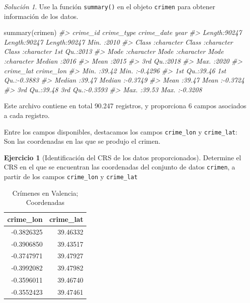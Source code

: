 \documentclass[
]{book}
\newenvironment{Shaded}{\begin{snugshade}}{\end{snugshade}}
\newcommand{\CommentTok}[1]{\textcolor[rgb]{0.56,0.35,0.01}{\textit{#1}}}
\newcommand{\FunctionTok}[1]{\textcolor[rgb]{0.00,0.00,0.00}{#1}}
\newcommand{\NormalTok}[1]{#1}
\theoremstyle{definition}
\theoremstyle{definition}
\theoremstyle{definition}
\newtheorem{exercise}{Ejercicio}[chapter]
\theoremstyle{definition}
\theoremstyle{remark}
\newtheorem*{solution}{Solución}
\begin{document}
\begin{solution}
Use la función \texttt{summary()} en el objeto \texttt{crimen} para obtener información de los
datos.
\end{solution}

\begin{Shaded}
\begin{Highlighting}[]
\FunctionTok{summary}\NormalTok{(crimen)}
\CommentTok{\#\textgreater{}    crime\_id          crime\_type         crime\_date             year     }
\CommentTok{\#\textgreater{}  Length:90247       Length:90247       Length:90247       Min.   :2010  }
\CommentTok{\#\textgreater{}  Class :character   Class :character   Class :character   1st Qu.:2013  }
\CommentTok{\#\textgreater{}  Mode  :character   Mode  :character   Mode  :character   Median :2016  }
\CommentTok{\#\textgreater{}                                                           Mean   :2015  }
\CommentTok{\#\textgreater{}                                                           3rd Qu.:2018  }
\CommentTok{\#\textgreater{}                                                           Max.   :2020  }
\CommentTok{\#\textgreater{}    crime\_lat       crime\_lon      }
\CommentTok{\#\textgreater{}  Min.   :39.42   Min.   :{-}0.4296  }
\CommentTok{\#\textgreater{}  1st Qu.:39.46   1st Qu.:{-}0.3883  }
\CommentTok{\#\textgreater{}  Median :39.47   Median :{-}0.3749  }
\CommentTok{\#\textgreater{}  Mean   :39.47   Mean   :{-}0.3724  }
\CommentTok{\#\textgreater{}  3rd Qu.:39.48   3rd Qu.:{-}0.3593  }
\CommentTok{\#\textgreater{}  Max.   :39.53   Max.   :{-}0.3208}
\end{Highlighting}
\end{Shaded}

Este archivo contiene en total
90.247 registros, y
proporciona 6 campos asociados a cada registro.

Entre los campos disponibles, destacamos los campos \texttt{crime\_lon} y \texttt{crime\_lat}:
Son las coordenadas en las que se produjo el crimen.

\begin{exercise}[Identificación del CRS de los datos proporcionados]
\protect\hypertarget{exr:ex27}{}\label{exr:ex27}Determine el CRS en el que se encuentran las coordenadas del conjunto de datos
\texttt{crimen}, a partir de los campos \texttt{crime\_lon} y \texttt{crime\_lat}
\end{exercise}

\begin{table}

\caption{\label{tab:coods-lonlat}Crímenes en Valencia; Coordenadas}
\centering
\begin{tabular}[t]{r|r}
\hline
crime\_lon & crime\_lat\\
\hline
-0.3826325 & 39.46332\\
\hline
-0.3906850 & 39.43517\\
\hline
-0.3747971 & 39.47927\\
\hline
-0.3992082 & 39.47982\\
\hline
-0.3596011 & 39.46740\\
\hline
-0.3552423 & 39.47461\\
\hline
\end{tabular}
\end{table}
\end{document}
